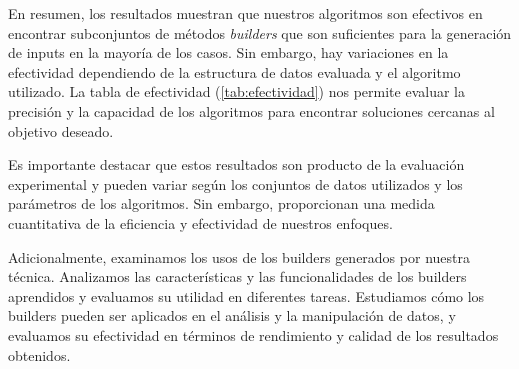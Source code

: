 En resumen, los resultados muestran que nuestros algoritmos son efectivos en encontrar subconjuntos de métodos \emph{builders} que son suficientes para la generación de inputs en la mayoría de los casos. Sin embargo, hay variaciones en la efectividad dependiendo de la estructura de datos evaluada y el algoritmo utilizado.
La tabla de efectividad (\ref{tab:efectividad}) nos permite evaluar la precisión y la capacidad de los algoritmos para encontrar soluciones cercanas al objetivo deseado.

Es importante destacar que estos resultados son producto de la evaluación experimental y pueden variar según los conjuntos de datos utilizados y los parámetros de los algoritmos. Sin embargo, proporcionan una medida cuantitativa de la eficiencia y efectividad de nuestros enfoques.









Adicionalmente, examinamos los usos de los builders generados por nuestra técnica. Analizamos las características y las funcionalidades de los builders aprendidos y evaluamos su utilidad en diferentes tareas. Estudiamos cómo los builders pueden ser aplicados en el análisis y la manipulación de datos, y evaluamos su efectividad en términos de rendimiento y calidad de los resultados obtenidos.







